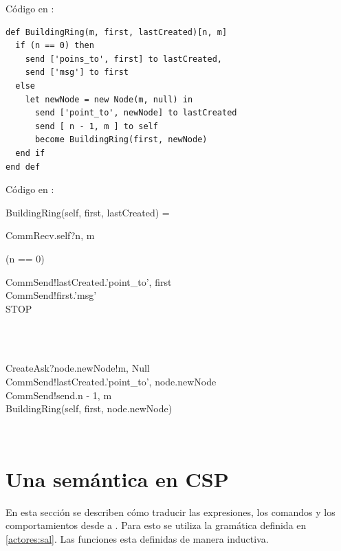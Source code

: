 Código en \SAL:

\begin{lstlisting}[language=sal, style=simple]
def BuildingRing(m, first, lastCreated)[n, m]
  if (n == 0) then
    send ['poins_to', first] to lastCreated,
    send ['msg'] to first
  else
    let newNode = new Node(m, null) in
      send ['point_to', newNode] to lastCreated
      send [ n - 1, m ] to self
      become BuildingRing(first, newNode)
  end if
end def
\end{lstlisting}

Código en \CSP:

\begin{process}
BuildingRing(self, first, lastCreated) = \\ \quad
  \begin{block}
  CommRecv.self?\langle n, m \rangle \then \\ \quad
  \begin{block} 
  \If (n == 0) \Then {} \\ \quad
    \begin{block}
    CommSend!lastCreated.\langle 'point\_to', first \rangle \then \\
    CommSend!first.\langle 'msg' \rangle \then \\
    STOP
    \end{block} \\
  \Else {} \\ \quad
    \begin{block} 
    CreateAsk?node.newNode!\langle m, Null \rangle \then \\
    CommSend!lastCreated.\langle 'point\_to', node.newNode \rangle \then \\
    CommSend!send.\langle n - 1, m \rangle \then \\
    BuildingRing(self, first, node.newNode) 
    \end{block} \\
  \end{block} 
\end{block}
\end{process}

\section{Una semántica en CSP}

En esta sección se describen cómo traducir las expresiones, los comandos y los comportamientos desde \SAL a \CSP. Para esto se utiliza la gramática definida en \ref{actores:sal}. Las funciones esta definidas de manera inductiva.

